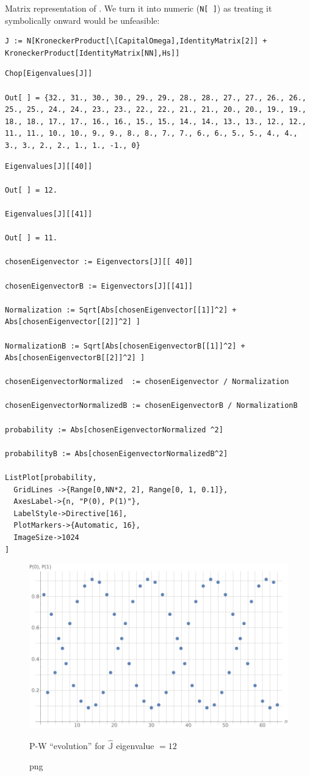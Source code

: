 Matrix representation of \cite[eq. 1]{Lloyd:Time}.
We turn it into numeric (\verb!N[ ]!) as treating  it symbolically onward would be unfeasible:
\begin{Verbatim}
J := N[KroneckerProduct[\[CapitalOmega],IdentityMatrix[2]] + KroneckerProduct[IdentityMatrix[NN],Hs]]
\end{Verbatim}
\begin{Verbatim}
Chop[Eigenvalues[J]]

Out[ ] = {32., 31., 30., 30., 29., 29., 28., 28., 27., 27., 26., 26., 25., 25., 24., 24., 23., 23., 22., 22., 21., 21., 20., 20., 19., 19., 18., 18., 17., 17., 16., 16., 15., 15., 14., 14., 13., 13., 12., 12., 11., 11., 10., 10., 9., 9., 8., 8., 7., 7., 6., 6., 5., 5., 4., 4., 3., 3., 2., 2., 1., 1., -1., 0}
\end{Verbatim}
\begin{Verbatim}
Eigenvalues[J][[40]]

Out[ ] = 12.

Eigenvalues[J][[41]]

Out[ ] = 11.

chosenEigenvector := Eigenvectors[J][[ 40]]

chosenEigenvectorB := Eigenvectors[J][[41]]

Normalization := Sqrt[Abs[chosenEigenvector[[1]]^2] + Abs[chosenEigenvector[[2]]^2] ]

NormalizationB := Sqrt[Abs[chosenEigenvectorB[[1]]^2] + Abs[chosenEigenvectorB[[2]]^2] ]

chosenEigenvectorNormalized  := chosenEigenvector / Normalization

chosenEigenvectorNormalizedB := chosenEigenvectorB / NormalizationB

probability := Abs[chosenEigenvectorNormalized ^2]

probabilityB := Abs[chosenEigenvectorNormalizedB^2]

ListPlot[probability,
  GridLines ->{Range[0,NN*2, 2], Range[0, 1, 0.1]},
  AxesLabel->{n, "P(0), P(1)"},
  LabelStyle->Directive[16],
  PlotMarkers->{Automatic, 16},
  ImageSize->1024
]
\end{Verbatim}
\begin{figure}[!h]
  \centering
  \includegraphics[width=.75\textwidth]{img/N32.png}
  \caption[]{png}{P-W ``evolution'' for $\hat{\mathbb{J}}$ eigenvalue $=12$}
\end{figure}
